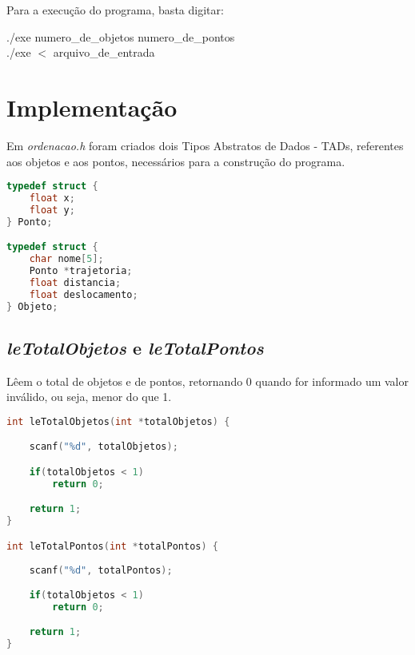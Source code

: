 \documentclass{article}
\begin{document}
Para a execução do programa, basta digitar:\\

\begin{tcolorbox}[title=,width=\linewidth]
    ./exe numero\_de\_objetos numero\_de\_pontos\\
    ./exe $<$ arquivo\_de\_entrada
\end{tcolorbox}

\clearpage


\section{Implementação}

\hspace*{\parindent}Em \textit{ordenacao.h} foram criados dois Tipos Abstratos de Dados - TADs, referentes aos objetos e aos pontos, necessários para a construção do programa.

\begin{lstlisting}[label={lst:cod1},language=C]
typedef struct {
    float x;
    float y;
} Ponto;

typedef struct {
    char nome[5];
    Ponto *trajetoria;
    float distancia;
    float deslocamento;
} Objeto;
\end{lstlisting}


\subsection{\textit{leTotalObjetos} e \textit{leTotalPontos}}

\hspace*{\parindent}Lêem o total de objetos e de pontos, retornando 0 quando for informado um valor inválido, ou seja, menor do que 1.

\begin{lstlisting}[label={lst:cod1},language=C]
int leTotalObjetos(int *totalObjetos) {

    scanf("%d", totalObjetos);

    if(totalObjetos < 1) 
        return 0;

    return 1;
}

int leTotalPontos(int *totalPontos) {
    
    scanf("%d", totalPontos);

    if(totalObjetos < 1) 
        return 0;

    return 1;
}
\end{lstlisting}
\end{document}

